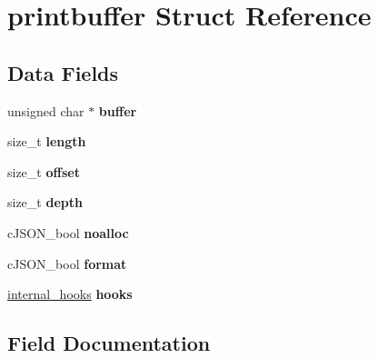 \hypertarget{structprintbuffer}{}\section{printbuffer Struct Reference}
\label{structprintbuffer}
\subsection*{Data Fields}
\begin{DoxyCompactItemize}
\item 
\mbox{\label{structprintbuffer_a754f63618e91db99f7ab6cfc4e629013}} 
unsigned char $\ast$ {\bfseries buffer}
\item 
\mbox{\label{structprintbuffer_a1a679f8b6fe9b413fb3a87203b0f5bc8}} 
size\+\_\+t {\bfseries length}
\item 
\mbox{\label{structprintbuffer_a3ed6f9d24d6591047680492a962dc7c9}} 
size\+\_\+t {\bfseries offset}
\item 
\mbox{\label{structprintbuffer_aa7311b5da38ff8d1737824c611b48732}} 
size\+\_\+t {\bfseries depth}
\item 
\mbox{\label{structprintbuffer_aa2a7966b71dc3535e4e3789c33ec5368}} 
c\+J\+S\+O\+N\+\_\+bool {\bfseries noalloc}
\item 
\mbox{\label{structprintbuffer_a75d3f480f5308e7f4afecf30e11277ef}} 
c\+J\+S\+O\+N\+\_\+bool {\bfseries format}
\item 
\mbox{\label{structprintbuffer_a43a8b3bcc644432f12f5aed5159d2520}} 
\hyperlink{structinternal__hooks}{internal\+\_\+hooks} {\bfseries hooks}
\end{DoxyCompactItemize}


\subsection{Field Documentation}
\mbox{\label{structprintbuffer_a754f63618e91db99f7ab6cfc4e629013}} 
